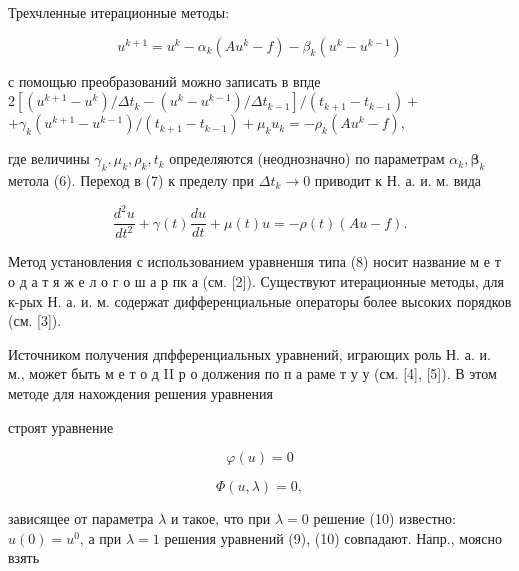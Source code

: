 \documentclass[10pt]{article}
\begin{document}
Трехчленные итерационные методы:



\[

u^{k+1}=u^{k}-\alpha_{k}\left(A u^{k}-f\right)-\beta_{k}\left(u^{k}-u^{k-1}\right)

\]



с помощью преобразований можно записать в впде $2\left[\left(u^{k+1}-u^{k}\right) / \Delta t_{k}-\left(u^{k}-u^{k-1}\right) / \Delta t_{k-1}\right] /\left(t_{k+1}-t_{k-1}\right)+$ $+\gamma_{k}\left(u^{k+1}-u^{k-1}\right) /\left(t_{k+1}-t_{k-1}\right)+\mu_{k} u_{k}=-\rho_{k}\left(A u^{k}-f\right)$,



где величины $\gamma_{k}, \mu_{k}, \rho_{k}, t_{k}$ определяются (неоднозначно) по параметрам $\alpha_{k}, \boldsymbol{\beta}_{k}$ метола (6). Переход в (7) к пределу при $\Delta t_{k} \rightarrow 0$ приводит к Н. а. и. м. вида



\[

\frac{d^{2} u}{d t^{2}}+\gamma(t) \frac{d u}{d t}+\mu(t) u=-\rho(t)(A u-f) .

\]



Метод установления с использованием уравненшя типа (8) носит название м е т о д а т я ж е л о г о ш а р пк а (см. [2]). Существуют итерационные методы, для к-рых Н. а. и. м. содержат дифференциальные операторы более высоких порядков (см. [3]).



Источником получения дпфференциальных уравнений, играющих роль Н. а. и. м., может быть м е т о д II р о должения по п а раме т у у (см. [4], [5]). В этом методе для нахождения решения уравнения



строят уравнение



\[

\varphi(u)=0

\]



\[

\Phi(u, \lambda)=0,

\]



зависящее от параметра $\lambda$ и такое, что при $\lambda=0$ решение (10) известно: $u(0)=u^{0}$, а при $\lambda=1$ решения уравнений (9), (10) совпадают. Напр., моясно взять
\end{document}
